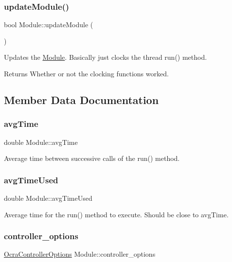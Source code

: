\subsubsection{\texorpdfstring{update\+Module()}{updateModule()}}
{\footnotesize\ttfamily bool Module\+::update\+Module (\begin{DoxyParamCaption}{ }\end{DoxyParamCaption})}

Updates the \hyperlink{classModule}{Module}. Basically just clocks the thread run() method. \begin{DoxyReturn}{Returns}
Whether or not the clocking functions worked. 
\end{DoxyReturn}


\subsection{Member Data Documentation}
\hypertarget{classModule_a1a20dbf0d18e5020ad85d38a0ba22b88}{}\label{classModule_a1a20dbf0d18e5020ad85d38a0ba22b88} 
\subsubsection{\texorpdfstring{avg\+Time}{avgTime}}
{\footnotesize\ttfamily double Module\+::avg\+Time\hspace{0.3cm}{\ttfamily [private]}}

Average time between successive calls of the {\ttfamily run()} method. \hypertarget{classModule_a5baf8260eb8a45ebbb75474f2b277edc}{}\label{classModule_a5baf8260eb8a45ebbb75474f2b277edc} 
\subsubsection{\texorpdfstring{avg\+Time\+Used}{avgTimeUsed}}
{\footnotesize\ttfamily double Module\+::avg\+Time\+Used\hspace{0.3cm}{\ttfamily [private]}}

Average time for the {\ttfamily run()} method to execute. Should be close to avg\+Time. \hypertarget{classModule_a04156183c6e15f118595e3637ab5372f}{}\label{classModule_a04156183c6e15f118595e3637ab5372f} 
\subsubsection{\texorpdfstring{controller\+\_\+options}{controller\_options}}
{\footnotesize\ttfamily \hyperlink{classOcraControllerOptions}{Ocra\+Controller\+Options} Module\+::controller\+\_\+options\hspace{0.3cm}{\ttfamily [private]}}

